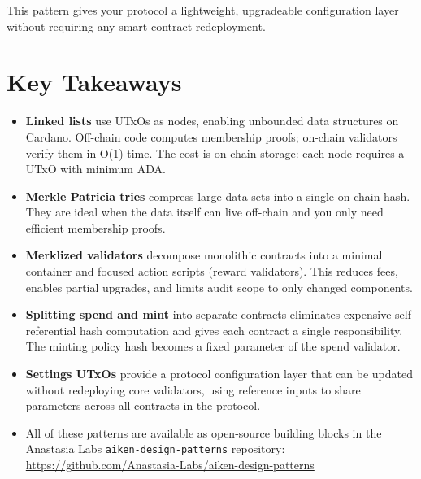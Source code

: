 This pattern gives your protocol a lightweight, upgradeable configuration layer without requiring any smart contract redeployment.

\section{Key Takeaways} \label{sec:advanced-takeaways}

\begin{itemize}
    \item \textbf{Linked lists} use UTxOs as nodes, enabling unbounded data structures on Cardano. Off-chain code computes membership proofs; on-chain validators verify them in O(1) time. The cost is on-chain storage: each node requires a UTxO with minimum ADA.
    \item \textbf{Merkle Patricia tries} compress large data sets into a single on-chain hash. They are ideal when the data itself can live off-chain and you only need efficient membership proofs.
    \item \textbf{Merklized validators} decompose monolithic contracts into a minimal container and focused action scripts (reward validators). This reduces fees, enables partial upgrades, and limits audit scope to only changed components.
    \item \textbf{Splitting spend and mint} into separate contracts eliminates expensive self-referential hash computation and gives each contract a single responsibility. The minting policy hash becomes a fixed parameter of the spend validator.
    \item \textbf{Settings UTxOs} provide a protocol configuration layer that can be updated without redeploying core validators, using reference inputs to share parameters across all contracts in the protocol.
    \item All of these patterns are available as open-source building blocks in the Anastasia Labs \texttt{aiken-design-patterns} repository: \url{https://github.com/Anastasia-Labs/aiken-design-patterns}
\end{itemize}
